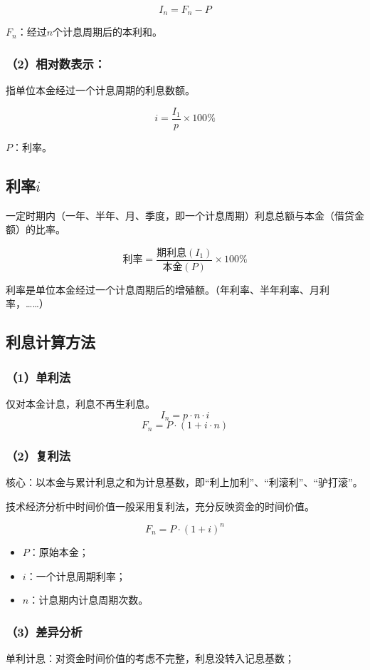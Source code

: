 \documentclass[12pt, a4paper, oneside]{ctexbook}
\begin{document}
$$I_n = F_n - P$$

$F_n$：经过$n$个计息周期后的本利和。
\subsubsection{（2）相对数表示：}
指单位本金经过一个计息周期的利息数额。

$$i = \frac{I_1}{p} \times 100\%$$

$P$：利率。

\subsection{利率$i$}

一定时期内（一年、半年、月、季度，即一个计息周期）利息总额与本金（借贷金额）的比率。

$$\mbox{利率} = \frac{\mbox{期利息}(I_1)}{\mbox{本金}(P)} \times 100\%$$

利率是单位本金经过一个计息周期后的增殖额。（年利率、半年利率、月利率，……）

\subsection{利息计算方法}
\subsubsection{（1）单利法}

仅对本金计息，利息不再生利息。
$$I_n= p \cdot n\cdot i$$
$$F_n=P \cdot (1+i \cdot n)$$

\subsubsection{（2）复利法}

核心：以本金与累计利息之和为计息基数，即“利上加利”、“利滚利”、“驴打滚”。

技术经济分析中时间价值一般采用复利法，充分反映资金的时间价值。

$$F_n=P \cdot (1+i)^n$$

\begin{itemize}
    \item $P$：原始本金；
    \item $i$：一个计息周期利率；
    \item $n$：计息期内计息周期次数。
\end{itemize}

\subsubsection{（3）差异分析}
单利计息：对资金时间价值的考虑不完整，利息没转入记息基数；
\end{document}

